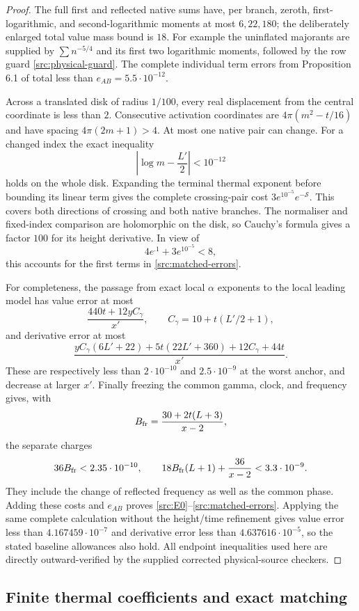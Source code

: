 \documentclass[11pt,a4paper]{article}
\theoremstyle{definition}
\theoremstyle{remark}
\begin{document}
\begin{proof}
The full first and reflected native sums have, per branch, zeroth,
first-logarithmic, and second-logarithmic moments at most $6,22,180$;
the deliberately enlarged total value mass bound is $18$.
For example the uninflated majorants are supplied by
$\sum n^{-5/4}$ and its first two logarithmic moments, followed by the
row guard \eqref{src:physical-guard}.  The complete individual term
errors from Proposition 6.1 of \cite{Polymath} total less than
$e_{AB}=5.5\cdot10^{-12}$.

Across a translated disk of radius $1/100$, every real displacement
from the central coordinate is less than $2$.  Consecutive activation
coordinates are $4\pi(m^2-t/16)$ and have spacing $4\pi(2m+1)>4$.
At most one native pair can change.  For a changed index the exact
inequality
\[
 \left|\log m-\frac{L'}2\right|<10^{-12}
\]
holds on the whole disk.  Expanding the terminal thermal exponent
before bounding its linear term gives the complete crossing-pair
cost $3e^{10^{-5}}e^{-\mathcal S}$.  This covers both directions of
crossing and both native branches.  The normaliser and fixed-index
comparison are holomorphic on the disk, so Cauchy's formula gives a
factor $100$ for its height derivative.  In view of
\[
 4e^{.1}+3e^{10^{-5}}<8,
\]
this accounts for the first terms in \eqref{src:matched-errors}.

For completeness, the passage from exact local $\alpha$ exponents to
the local leading model has value error at most
\[
 \frac{440t+12yC_\gamma}{x'},\qquad
 C_\gamma=10+t(L'/2+1),
\]
and derivative error at most
\[
 \frac{yC_\gamma(6L'+22)+5t(22L'+360)+12C_\gamma+44t}{x'}.
\]
These are respectively less than $2\cdot10^{-10}$ and
$2.5\cdot10^{-9}$ at the worst anchor, and decrease at larger $x'$.
Finally freezing the common gamma, clock, and frequency gives, with
\[
 B_{\rm fr}=\frac{30+2t(L+3)}{x-2},
\]
the separate charges
\[
 36B_{\rm fr}<2.35\cdot10^{-10},\qquad
 18B_{\rm fr}(L+1)+\frac{36}{x-2}<3.3\cdot10^{-9}.
\]
They include the change of reflected frequency as well as the common
phase.  Adding these costs and $e_{AB}$ proves
\eqref{src:E0}--\eqref{src:matched-errors}.  Applying the same complete
calculation without the height/time refinement gives value error less
than $4.167459\cdot10^{-7}$ and derivative error less than
$4.637616\cdot10^{-5}$, so the stated baseline allowances also hold.
All endpoint inequalities used here are directly outward-verified by
the supplied corrected physical-source checkers.
\end{proof}

\subsection{Finite thermal coefficients and exact matching}
\label{src:thermal}
\end{document}
